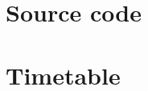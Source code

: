 \documentclass[10pt,a4paper]{article}
\newcommand{\includecode}[2][c]{<!---->}
\def\HOME{../..}
\def\KSRC{\HOME/src/kernel}
\begin{document}
\begin{appendices}

    \section{Source code}
    \section{Timetable}
        \label{app:timetable}



%


%
%    
%    

%    
%    
%    
%
\end{appendices}
\end{document}
